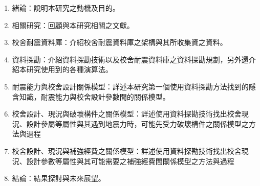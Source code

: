 \begin{enumerate}
\item 緒論：說明本研究之動機及目的。
\item 相關研究：回顧與本研究相關之文獻。
\item 校舍耐震資料庫：介紹校舍耐震資料庫之架構與其所收集資之資料。
\item 資料探勘：介紹資料探勘技術以及校舍耐震資料庫之資料探勘規劃，另外還介紹本研究使用到的各種演算法。
\item 耐震能力與校舍設計關係模型：詳述本研究第一個使用資料探勘方法找到的隱含知識，耐震能力與校舍設計參數間的關係模型。
\item 校舍設計、現況與破壞構件之關係模型：詳述使用資料探勘技術找出校舍現況、設計參屬等屬性與其遇到地震力時，可能先受力破壞構件之關係模型之方法與過程
\item 校舍設計、現況與補強經費之關係模型：詳述使用資料探勘技術找出校舍現況、設計參數等屬性與其可能需要之補強經費間關係模型之方法與過程
\item 結論：結果探討與未來展望。
\end{enumerate}



